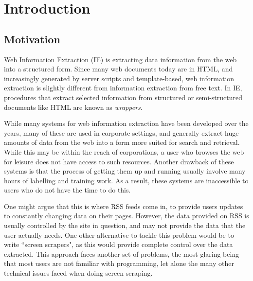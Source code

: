 \chapter{Introduction}

\section{Motivation}
Web Information Extraction (IE) is extracting data information from the web into a structured form.
Since many web documents today are in HTML, and increasingly generated by server scripts and
template-based, web information extraction is slightly different from information extraction
from free text. In IE, procedures that extract selected information from structured or semi-structured
documents like HTML are known as \textit{wrappers}.

While many systems for web information extraction have been developed over the years, many of
these are used in corporate settings, and generally extract huge amounts of data from the web
into a form more suited for search and retrieval. While this may be within the reach of
corporations, a user who browses the web for leisure does not have access to such resources.
Another drawback of these systems is that the process of getting them up and running usually
involve many hours of labelling and training work. As a result, these systems are inaccessible
to users who do not have the time to do this.

One might argue that this is where RSS feeds come in, to provide users updates to constantly
changing data on their pages. However, the data provided on RSS is usually controlled by the
site in question, and may not provide the data that the user actually needs. One other
alternative to tackle this problem would be to write ``screen scrapers", as this would provide
complete control over the data extracted. This approach faces another set of problems, the most
glaring being that most users are not familiar with programming, let alone the many other
technical issues faced when doing screen scraping.


